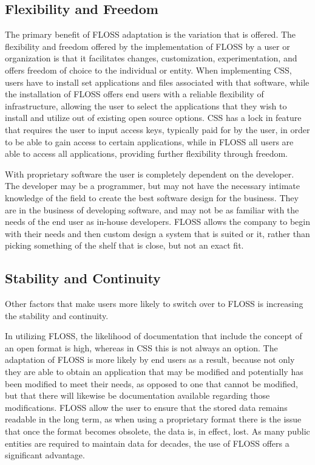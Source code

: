  \subsection {Flexibility and Freedom } 
  The primary benefit of FLOSS adaptation is the variation that is offered. The flexibility and freedom offered by the implementation of FLOSS by a user or organization is that it facilitates changes, customization, experimentation, and offers freedom of choice to the individual or entity. When implementing CSS, users have to install set applications and files associated with that software, while the installation of FLOSS offers end users with a reliable flexibility of infrastructure, allowing the user to select the applications that they wish to install and utilize out of existing open source options. CSS has a lock in feature that requires the user to input access keys, typically paid for by the user, in order to be able to gain access to certain applications, while in FLOSS all users are able to access all applications, providing further flexibility through freedom. 

  With proprietary software the user is completely dependent on the developer. The developer may be a programmer, but may not have the necessary intimate knowledge of the field to create the best software design for the business. They are in the business of developing software, and may not be as familiar with the needs of the end user as in-house developers. FLOSS allows the company to begin with their needs and then custom design a system that is suited or it, rather than picking something of the shelf that is close, but not an exact fit. 

  \subsection {Stability and Continuity} 

Other factors that make users more likely to switch over to FLOSS is increasing the stability and continuity.

In utilizing FLOSS, the likelihood of documentation that include the concept of an open format is high, whereas in CSS this is not always an option. The adaptation of FLOSS is more likely by end users as a result, because not only they are able to obtain an application that may be modified and potentially has been modified to meet their needs, as opposed to one that cannot be modified, but that there will likewise be documentation available regarding those modifications. FLOSS allow the user to ensure that the stored data remains readable in the long term, as when using a proprietary format there is the issue that once the format becomes obsolete, the data is, in effect, lost. As many public entities are required to maintain data for decades, the use of FLOSS offers a significant advantage.

